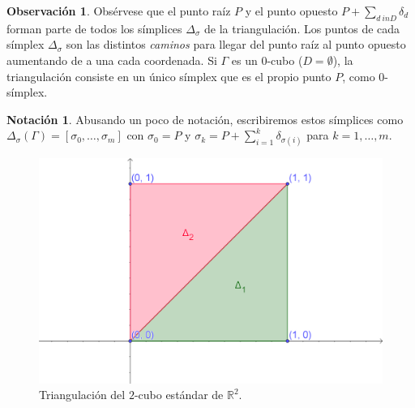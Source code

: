 \documentclass[12pt,a4paper,twoside]{article} %
\theoremstyle{plain}
\theoremstyle{definition}
\newtheorem*{notacion}{Notación}
\newtheorem{observacion}{Observación}[subsection]
\newcommand{\R}{\mathbb{R}}
\begin{document}
\begin{observacion}
Obsérvese que el punto raíz $P$ y el punto opuesto $P+\sum_{d\ in D}\delta_d$ forman parte de todos los símplices $\Delta_\sigma$ de la triangulación. Los puntos de cada símplex $\Delta_\sigma$ son las distintos \emph{caminos} para llegar del punto raíz al punto opuesto aumentando de a una cada coordenada.  Si $\Gamma$ es un $0$-cubo ($D=\emptyset$), la triangulación consiste en un único símplex que es el propio punto $P$, como $0$-símplex.
\end{observacion}

\begin{notacion}
Abusando un poco de notación, escribiremos estos símplices como $\Delta_\sigma(\Gamma)=[\sigma_0,\dots,\sigma_m]$ con $\sigma_0=P$ y $\sigma_k=P+\sum_{i=1}^k\delta_{\sigma(i)}$ para $k=1,\dots,m$.
\end{notacion}

\begin{figure}[h!]
\centering
\includegraphics[scale=0.40]{img/triangulacioncuadrado.png}
\caption{Triangulación del $2$-cubo estándar de $\R^2$.}
\label{triangulacioncuadrado}
\end{figure}
\end{document}
